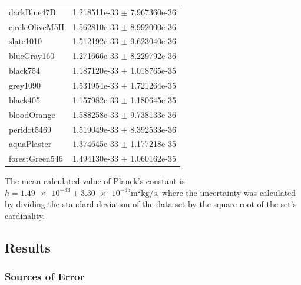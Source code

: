 \documentclass[a4paper]{article}
\begin{document}
\begin{table}[H]
\begin{center}
\begin{tabular}{|l|l|}
      darkBlue47B &            1.218511e-33 \( \pm \) 7.967360e-36 \\
      circleOliveM5H &         1.562810e-33 \( \pm \) 8.992000e-36 \\
      slate1010 &              1.512192e-33 \( \pm \) 9.623040e-36 \\
      blueGray160 &            1.271666e-33 \( \pm \) 8.229792e-36 \\
      black754 &               1.187120e-33 \( \pm \) 1.018765e-35 \\
      grey1090 &               1.531954e-33 \( \pm \) 1.721264e-35 \\
      black405 &               1.157982e-33 \( \pm \) 1.180645e-35 \\
      bloodOrange &            1.588258e-33 \( \pm \) 9.738133e-36 \\
      peridot5469 &            1.519049e-33 \( \pm \) 8.392533e-36 \\
      aquaPlaster &            1.374645e-33 \( \pm \) 1.177218e-35 \\
      forestGreen546 &         1.494130e-33 \( \pm \) 1.060162e-35 \\
      \hline
    \end{tabular} 
  \end{center} 
  \label{tab:plancks}
\end{table}

The mean calculated value of Planck's constant is \( h = \num{1.49e-33} \pm
\num{3.30e-35} \si{\square\meter\kilo\gram\per\second} \), where the uncertainty
was calculated by dividing the standard deviation of the data set by the square
root of the set's cardinality.
 

\subsection{Results}


\subsubsection{Sources of Error}
\end{document}
